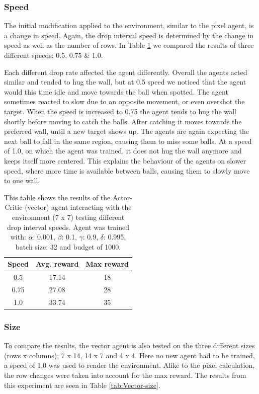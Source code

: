 \documentclass{article}
\begin{document}
\subsubsection{Speed}
The initial modification applied to the environment, similar to the pixel agent, is a change in speed.
Again, the drop interval speed is determined by the change in speed as well as the number of rows. 
In Table \ref{tab:Vector-speed} we compared the results of three different speeds; 0.5, 0.75 \& 1.0. 

Each different drop rate affected the agent differently. 
Overall the agents acted similar and tended to hug the wall, but at 0.5 speed we noticed that the agent would this time idle and move towards the ball when spotted.
The agent sometimes reacted to slow due to an opposite movement, or even overshot the target. 
When the speed is increased to 0.75 the agent tends to hug the wall shortly before moving to catch the balls.
After catching it moves towards the preferred wall, until a new target shows up.
The agents are again expecting the next ball to fall in the same region, causing them to miss some balls.
At a speed of 1.0, on which the agent was trained, it does not hug the wall anymore and keeps itself more centered.
This explains the behaviour of the agents on slower speed, where more time is available between balls, causing them to slowly move to one wall. 

\begin{table}[htbp]
    \centering
    \begin{tabular}{|c|c|c|}
        \hline
        \textbf{Speed} & \textbf{Avg. reward} & \textbf{Max reward} \\
        \hline
        0.5   & 17.14       & 18                  \\
        0.75   & 27.08       & 28                  \\
        1.0   & 33.74        & 35                 \\
        \hline
    \end{tabular}
    \caption{This table shows the results of the Actor-Critic (vector) agent interacting with the environment (7 x 7) testing different drop interval speeds. Agent was trained with: $\alpha$: 0.001, $\beta$: 0.1, $\gamma$: 0.9, $\delta$: 0.995, batch size: 32 and budget of 1000. }
    \label{tab:Vector-speed}
\end{table}

\subsubsection{Size}
To compare the results, the vector agent is also tested on the three different sizes (rows x columns); 7 x 14, 14 x 7 and 4 x 4. 
Here no new agent had to be trained, a speed of 1.0 was used to render the environment. 
Alike to the pixel calculation, the row changes were taken into account for the max reward. 
The results from this experiment are seen in Table \ref{tab:Vector-size}.
\end{document}
